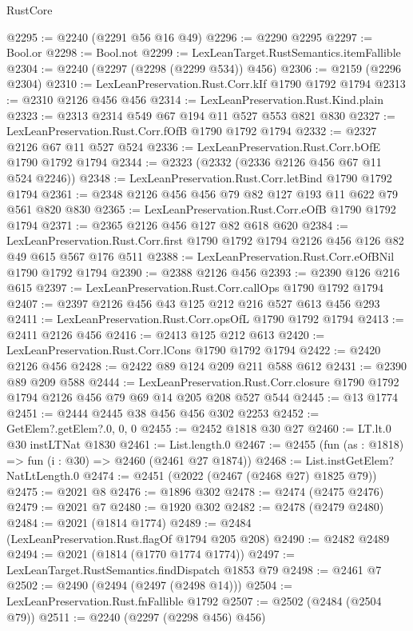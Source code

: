 \begin{lexlean}{RustCore}
\begin{coremodule}
@2295 := @2240 (@2291 @56 @16 @49)
@2296 := @2290 @2295
@2297 := Bool.or
@2298 := Bool.not
@2299 := LexLeanTarget.RustSemantics.itemFallible
@2304 := @2240 (@2297 (@2298 (@2299 @534)) @456)
@2306 := @2159 (@2296 @2304)
@2310 := LexLeanPreservation.Rust.Corr.kIf @1790 @1792 @1794
@2313 := @2310 @2126 @456 @456
@2314 := LexLeanPreservation.Rust.Kind.plain
@2323 := @2313 @2314 @549 @67 @194 @11 @527 @553 @821 @830
@2327 := LexLeanPreservation.Rust.Corr.fOfB @1790 @1792 @1794
@2332 := @2327 @2126 @67 @11 @527 @524
@2336 := LexLeanPreservation.Rust.Corr.bOfE @1790 @1792 @1794
@2344 := @2323 (@2332 (@2336 @2126 @456 @67 @11 @524 @2246))
@2348 := LexLeanPreservation.Rust.Corr.letBind @1790 @1792 @1794
@2361 := @2348 @2126 @456 @456 @79 @82 @127 @193 @11 @622 @79 @561 @820 @830
@2365 := LexLeanPreservation.Rust.Corr.eOfB @1790 @1792 @1794
@2371 := @2365 @2126 @456 @127 @82 @618 @620
@2384 := LexLeanPreservation.Rust.Corr.first
    @1790
    @1792
    @1794
    @2126
    @456
    @126
    @82
    @49
    @615
    @567
    @176
    @511
@2388 := LexLeanPreservation.Rust.Corr.eOfBNil @1790 @1792 @1794
@2390 := @2388 @2126 @456
@2393 := @2390 @126 @216 @615
@2397 := LexLeanPreservation.Rust.Corr.callOps @1790 @1792 @1794
@2407 := @2397 @2126 @456 @43 @125 @212 @216 @527 @613 @456 @293
@2411 := LexLeanPreservation.Rust.Corr.opsOfL @1790 @1792 @1794
@2413 := @2411 @2126 @456
@2416 := @2413 @125 @212 @613
@2420 := LexLeanPreservation.Rust.Corr.lCons @1790 @1792 @1794
@2422 := @2420 @2126 @456
@2428 := @2422 @89 @124 @209 @211 @588 @612
@2431 := @2390 @89 @209 @588
@2444 := LexLeanPreservation.Rust.Corr.closure
    @1790
    @1792
    @1794
    @2126
    @456
    @79
    @69
    @14
    @205
    @208
    @527
    @544
@2445 := @13 @1774
@2451 := @2444 @2445 @38 @456 @456 @302 @2253
@2452 := GetElem?.getElem?.{0, 0, 0}
@2455 := @2452 @1818 @30 @27
@2460 := LT.lt.{0} @30 instLTNat @1830
@2461 := List.length.{0}
@2467 := @2455 (fun (as : @1818) => fun (i : @30) => @2460 (@2461 @27 @1874))
@2468 := List.instGetElem?NatLtLength.{0}
@2474 := @2451 (@2022 (@2467 (@2468 @27) @1825 @79))
@2475 := @2021 @8
@2476 := @1896 @302
@2478 := @2474 (@2475 @2476)
@2479 := @2021 @7
@2480 := @1920 @302
@2482 := @2478 (@2479 @2480)
@2484 := @2021 (@1814 @1774)
@2489 := @2484 (LexLeanPreservation.Rust.flagOf @1794 @205 @208)
@2490 := @2482 @2489
@2494 := @2021 (@1814 (@1770 @1774 @1774))
@2497 := LexLeanTarget.RustSemantics.findDispatch @1853 @79
@2498 := @2461 @7
@2502 := @2490 (@2494 (@2497 (@2498 @14)))
@2504 := LexLeanPreservation.Rust.fnFallible @1792
@2507 := @2502 (@2484 (@2504 @79))
@2511 := @2240 (@2297 (@2298 @456) @456)

\end{coremodule}
\end{lexlean}
